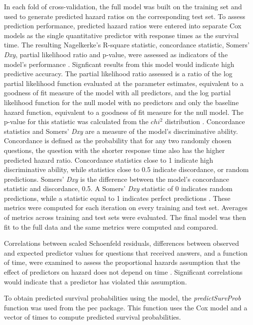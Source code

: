 \documentclass{article}
\begin{document}
In each fold of cross-validation, the full model was built on the training set and used to generate predicted hazard ratios on the corresponding test set. To assess prediction performance, predicted hazard ratios were entered into separate Cox models as the single quantitative predictor with response times as the survival time. The resulting Nagelkerke's R-square statistic, concordance statistic, Somers' \textit{Dxy}, partial likelihood ratio and p-value, were assessed as indicators of the model's performance \cite{Chen}. Signficant results from this model would indicate high predictive accuracy. The partial likelihood ratio assessed is a ratio of the log partial likelihood function evaluated at the parameter estimates, equivalent to a goodness of fit measure of the model with all predictors, and the log partial likelihood function for the null model with no predictors and only the baseline hazard function, equivalent to a goodness of fit measure for the null model. The p-value for this statistic was calculated from the $chi^2$ distribution \cite{find}. Concordance statistics and Somers' \textit{Dxy} are a measure of the model's discriminative ability. Concordance is defined as the probability that for any two randomly chosen questions, the question with the shorter response time also has the higher predicted hazard ratio. Concordance statistics close to 1 indicate high discriminative ability, while statistics close to 0.5 indicate discordance, or random predictions. Somers' \textit{Dxy} is the difference between the model's concordance statistic and discordance, 0.5. A Somers' \textit{Dxy} statistic of 0 indicates random predictions, while a statistic equal to 1 indicates perfect predictions \cite{Harrell2015}. These metrics were computed for each iteration on every training and test set. Averages of metrics across training and test sets were evaluated. The final model was then fit to the full data and the same metrics were computed and compared. 

Correlations between scaled Schoenfeld residuals, differences between observed and expected predictor values for questions that received answers, and a function of time, were examined to assess the proportional hazards assumption that the effect of predictors on hazard does not depend on time \cite{Grambsch1994}. Significant correlations would indicate that a predictor has violated this assumption.

To obtain predicted survival probabilities using the model, the \textit{predictSurvProb} function was used from the pec package. This function uses the Cox model and a vector of times to compute predicted survival probabilities. 
\end{document}
